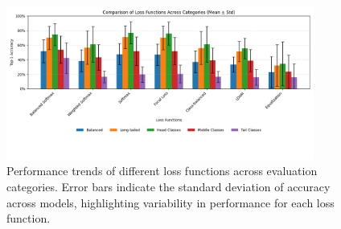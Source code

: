 

\begin{figure}[h!]
    \centering
    \includegraphics[width=0.9\textwidth]{Images/Plots/loss_function_bar_plot_mean_std.png}
    \caption{Performance trends of different loss functions across evaluation categories. Error bars indicate the standard deviation of accuracy across models, highlighting variability in performance for each loss function.}
    \label{fig:loss_comparison_bars}
\end{figure}
\FloatBarrier


